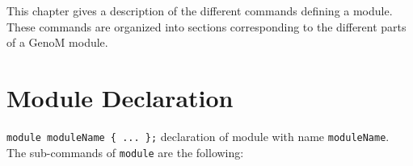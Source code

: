 %
%
%
%
%
%

This chapter gives a description of the different commands defining
a {\GenoM} module. These commands are organized into sections
corresponding to the different parts of a GenoM module.

\section{Module Declaration}
\label{sec|declaration}

\noindent
{\tt module moduleName \{ ... \};} declaration of module with name
{\tt moduleName}. \\

\noindent
The sub-commands of {\tt module} are the following:

